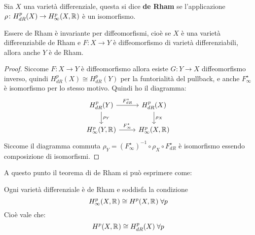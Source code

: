 \begin{definition}
  Sia $ X $ una varietà differenziale, questa si dice \textbf{de Rham}
  se l'applicazione $ \rho \colon H^p_{dR}(X) \to H^p_\infty(X, \mathbb{R}^{}) $ è un isomorfismo.
\end{definition}
\begin{lemma}
  Essere de Rham è invariante per diffeomorfismi, cioè se $ X $ è una varietà
  differenziabile de Rham e $ F \colon X \to Y $ è diffeomorfismo di varietà
  differenziabili, allora anche $ Y $ è de Rham.
\end{lemma}
\begin{proof}
  Siccome $ F \colon X \to Y $ è diffeomorfismo allora esiste $ G \colon Y \to X $ diffeomorfismo
  inverso, quindi $ H^p_{dR}(X) \cong H^p_{dR}(Y) $ per la funtorialità del pullback,
  e anche $ F^\star_\infty $ è isomorfismo per lo stesso motivo.
  Quindi ho il diagramma:
  \[
    \begin{tikzcd}
      H^p_{dR}(Y) \dar{\rho_Y} \rar{F^\star_{dR}} & H^p_{dR}(X) \dar{\rho_X} \\
      H^p_\infty(Y, \RN{}) \rar{F^\star_\infty} & H^p_\infty(X, \RN{})
    \end{tikzcd}
  \]
  Siccome il diagramma commuta $ \rho_Y = (F^\star_\infty)^{-1} \circ \rho_X \circ F^\star_{dR} $ è
  isomorfismo essendo composizione di isomorfismi.
\end{proof}
\eproof
A questo punto il teorema di de Rham si può esprimere come:
\begin{theorem}
  Ogni varietà differenziale è de Rham e soddisfa la condizione
  \[
    H^p_\infty(X, \mathbb{R}^{}) \cong H^p(X, \mathbb{R}^{}) \; \forall p
  \]
  Cioè vale che:
  \[
    H^p(X, \mathbb{R}^{}) \cong H^p_{dR}(X) \; \forall p
  \]
\end{theorem}
